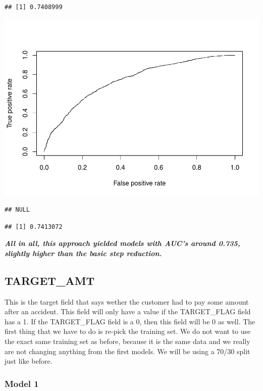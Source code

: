 \documentclass[]{article}
\begin{document}
\begin{verbatim}
## [1] 0.7408999
\end{verbatim}

\includegraphics{DATA621-Homework-4_files/figure-latex/unnamed-chunk-21-4.pdf}

\begin{verbatim}
## NULL
\end{verbatim}

\begin{verbatim}
## [1] 0.7413072
\end{verbatim}

\textbf{\emph{All in all, this approach yielded models with AUC's around
0.735, slightly higher than the basic step reduction.}}

\subsection{TARGET\_AMT}\label{targetux5famt}

This is the target field that says wether the customer had to pay some
amount after an accident. This field will only have a value if the
TARGET\_FLAG field has a 1. If the TARGET\_FLAG field is a 0, then this
field will be 0 as well. The first thing that we have to do is re-pick
the training set. We do not want to use the exact same training set as
before, because it is the same data and we really are not changing
anything from the first models. We will be using a 70/30 split just like
before.

\subsubsection{Model 1}\label{model-1-1}
\end{document}
